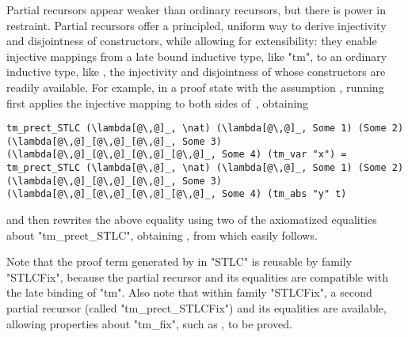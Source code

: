 Partial recursors appear weaker than ordinary recursors,
but there is power in restraint.
Partial recursors offer a principled, uniform way to derive injectivity and disjointness of
constructors, while allowing for extensibility:
they enable injective mappings from a late bound inductive
type, like "tm", to an ordinary inductive type, like \lsti{\nat},
the injectivity and disjointness of whose constructors are readily
available.
%
For example, in a proof state with the assumption ,
running  first applies the injective mapping to
both sides of~, obtaining

\begin{centered}
\begin{minipage}{.98\textwidth}
\begin{lstlisting}[basicstyle=\fontsize{8.25}{9}\ttfamily]
tm_prect_STLC (\lambda[@\,@]_, \nat) (\lambda[@\,@]_, Some 1) (Some 2) (\lambda[@\,@]_[@\,@]_[@\,@]_, Some 3) (\lambda[@\,@]_[@\,@]_[@\,@]_[@\,@]_, Some 4) (tm_var "x") =
tm_prect_STLC (\lambda[@\,@]_, \nat) (\lambda[@\,@]_, Some 1) (Some 2) (\lambda[@\,@]_[@\,@]_[@\,@]_, Some 3) (\lambda[@\,@]_[@\,@]_[@\,@]_[@\,@]_, Some 4) (tm_abs "y" t)
\end{lstlisting}
\end{minipage}
\end{centered}

\noindent
and then rewrites the above equality using two of the axiomatized
equalities about "tm_prect_STLC",
obtaining ,
from which  easily follows.

Note that the proof term generated by  in "STLC"
is reusable by family "STLCFix", because the partial recursor and its
equalities are compatible with the late binding of "tm".
Also note that within family "STLCFix", a second partial recursor
(called "tm_prect_STLCFix") and its equalities are available,
allowing properties about "tm_fix",
such as , to be proved.



\ifShowOldWriting

\newpage

